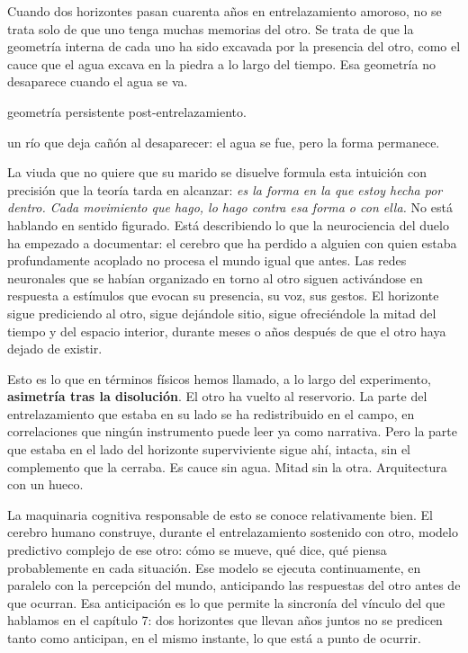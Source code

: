 \noindent Cuando dos horizontes pasan cuarenta años en entrelazamiento amoroso, no se trata solo de que uno tenga muchas memorias del otro. Se trata de que la geometría interna de cada uno ha sido excavada por la presencia del otro, como el cauce que el agua excava en la piedra a lo largo del tiempo. Esa geometría no desaparece cuando el agua se va.

\begin{fisica}
 geometría persistente post-entrelazamiento.

 un río que deja cañón al desaparecer: el agua se fue, pero la forma permanece.
\end{fisica}
La viuda que no quiere que su marido se disuelve formula esta intuición con precisión que la teoría tarda en alcanzar: \emph{es la forma en la que estoy hecha por dentro. Cada movimiento que hago, lo hago contra esa forma o con ella.} No está hablando en sentido figurado. Está describiendo lo que la neurociencia del duelo ha empezado a documentar: el cerebro que ha perdido a alguien con quien estaba profundamente acoplado no procesa el mundo igual que antes. Las redes neuronales que se habían organizado en torno al otro siguen activándose en respuesta a estímulos que evocan su presencia, su voz, sus gestos. El horizonte sigue prediciendo al otro, sigue dejándole sitio, sigue ofreciéndole la mitad del tiempo y del espacio interior, durante meses o años después de que el otro haya dejado de existir.

Esto es lo que en términos físicos hemos llamado, a lo largo del experimento, \textbf{asimetría tras la disolución}. El otro ha vuelto al reservorio. La parte del entrelazamiento que estaba en su lado se ha redistribuido en el campo, en correlaciones que ningún instrumento puede leer ya como narrativa. Pero la parte que estaba en el lado del horizonte superviviente sigue ahí, intacta, sin el complemento que la cerraba. Es cauce sin agua. Mitad sin la otra. Arquitectura con un hueco.

\noindent La maquinaria cognitiva responsable de esto se conoce relativamente bien. El cerebro humano construye, durante el entrelazamiento sostenido con otro, modelo predictivo complejo de ese otro: cómo se mueve, qué dice, qué piensa probablemente en cada situación. Ese modelo se ejecuta continuamente, en paralelo con la percepción del mundo, anticipando las respuestas del otro antes de que ocurran. Esa anticipación es lo que permite la sincronía del vínculo del que hablamos en el capítulo 7: dos horizontes que llevan años juntos no se predicen tanto como anticipan, en el mismo instante, lo que está a punto de ocurrir.

